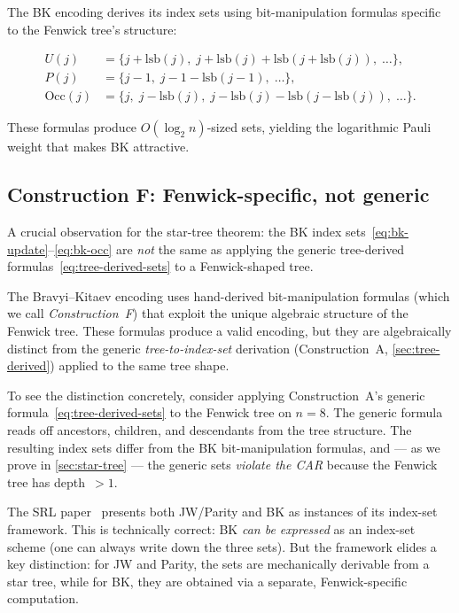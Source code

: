 The BK encoding derives its index sets using bit-manipulation
formulas specific to the Fenwick tree's structure:

\begin{align}
  U(j) &= \{j + \mathrm{lsb}(j),\; j + \mathrm{lsb}(j) +
    \mathrm{lsb}(j + \mathrm{lsb}(j)),\; \ldots\},
    \label{eq:bk-update} \\
  P(j) &= \{j - 1,\; j - 1 - \mathrm{lsb}(j-1),\; \ldots\},
    \label{eq:bk-parity} \\
  \mathrm{Occ}(j) &= \{j,\; j - \mathrm{lsb}(j),\;
    j - \mathrm{lsb}(j) - \mathrm{lsb}(j - \mathrm{lsb}(j)),\;
    \ldots\}.
    \label{eq:bk-occ}
\end{align}

These formulas produce $O(\log_2 n)$-sized sets, yielding the
logarithmic Pauli weight that makes BK attractive.

\subsection{Construction F: Fenwick-specific, not generic}
\label{sec:construction-f}

A crucial observation for the star-tree theorem:
the BK index sets~\eqref{eq:bk-update}--\eqref{eq:bk-occ} are
\emph{not} the same as applying the generic tree-derived
formulas~\eqref{eq:tree-derived-sets} to a Fenwick-shaped tree.

\begin{keyinsight}
The Bravyi--Kitaev encoding uses hand-derived bit-manipulation
formulas (which we call \emph{Construction~F}) that exploit the
unique algebraic structure of the Fenwick tree.  These formulas
produce a valid encoding, but they are algebraically distinct from
the generic \emph{tree-to-index-set} derivation
(Construction~A, \cref{sec:tree-derived}) applied to the same tree
shape.
\end{keyinsight}

To see the distinction concretely, consider applying
Construction~A's generic formula~\eqref{eq:tree-derived-sets} to
the Fenwick tree on $n = 8$.  The generic formula reads off
ancestors, children, and descendants from the tree structure.  The
resulting index sets differ from the BK bit-manipulation formulas,
and --- as we prove in \cref{sec:star-tree} --- the generic sets
\emph{violate the CAR} because the Fenwick tree has depth~$> 1$.

The SRL paper~\cite{seeley2012} presents both JW/Parity and BK as
instances of its index-set framework.  This is technically correct:
BK \emph{can be expressed} as an index-set scheme (one can always
write down the three sets).  But the framework elides a key
distinction: for JW and Parity, the sets are mechanically derivable
from a star tree, while for BK, they are obtained via a separate,
Fenwick-specific computation.

